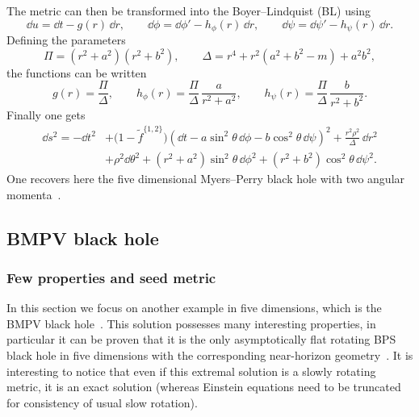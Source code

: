 The metric can then be transformed into the Boyer--Lindquist (BL) using
\begin{equation}
	\label{higher:change:5d-bl}
	\dd u = \dd t - g(r)\, \dd r, \qquad
	\dd\phi = \dd\phi' - h_\phi(r)\, \dd r, \qquad
	\dd\psi = \dd\psi' - h_\psi(r)\, \dd r.
\end{equation} 
Defining the parameters\footnotemark{}%
\begin{equation}
	\Pi = (r^2 + a^2) (r^2 + b^2), \qquad
	\Delta = r^4 + r^2 (a^2 + b^2- m) + a^2 b^2,
\end{equation}
the functions can be written
\begin{equation}
	\label{higher:change:myers-perry:bl-g-h}
	g(r) = \frac{\Pi}{\Delta}, \qquad
	h_\phi(r) = \frac{\Pi}{\Delta}\, \frac{a}{r^2 + a^2}, \qquad
	h_\psi(r) = \frac{\Pi}{\Delta}\, \frac{b}{r^2 + b^2}.
\end{equation} 
Finally one gets
\begin{equation}
	\label{higher-jna:metric:rotating:5d-2-moments-bl}
	\begin{aligned}
		\dd s^2 = - \dd t^2
			&+ \big(1 - \tilde f^{\{1, 2\}} \big) (\dd t - a \sin^2 \theta\, \dd \phi - b \cos^2 \theta\, \dd \psi)^2
			+ \frac{r^2 \rho^2}{\Delta}\, \dd r^2 \\
			&+ \rho^2 \dd\theta^2
			+ (r^2 + a^2) \sin^2 \theta\, \dd\phi^2
			+ (r^2 + b^2) \cos^2 \theta\, \dd \psi^2.
	\end{aligned}
\end{equation} 
One recovers here the five dimensional Myers--Perry black hole with two angular momenta~\cite{Myers:1986:BlackHolesHigher}.


\subsection{BMPV black hole}
\label{sec:higher-jna:5d:bmpv}




\subsubsection{Few properties and seed metric}


In this section we focus on another example in five dimensions, which is the BMPV black hole~\cite{Breckenridge:1997:DbranesSpinningBlack, Gauntlett:1999:BlackHolesD5}.
This solution possesses many interesting properties, in particular it can be proven that it is the only asymptotically flat rotating BPS black hole in five dimensions with the corresponding near-horizon geometry~\cites[sec.~7.2.2, 8.5]{Emparan:2008:BlackHolesHigher}{Reall:2003:HigherDimensionalBlack}.\footnotemark{}%
It is interesting to notice that even if this extremal solution is a slowly rotating metric, it is an exact solution (whereas Einstein equations need to be truncated for consistency of usual slow rotation).

